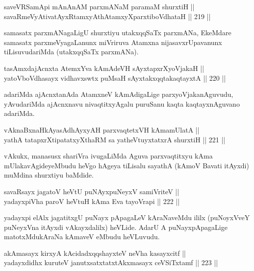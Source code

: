 \begin{shl}
saveVRSamApi mAnAnAM parxmANaM paramaM shurxtiH || \\
savaRmeVyAtivatAyxRtamxyAthAtamxyXparxtiboVdhataH \hfill || 219 ||  
\end{shl}

\begin{artha}
samasatx parxmANagaLigU shurxtiyu utakxqqSaTx parxmANa, EkeMdare
samasatx parxmeVyagaLanunx miVriruva Atamxna nijasavxrUpavanunx
tiLisuvudariMda (utakxqqSaTx parxmANa).
\end{artha}

\begin{shl}
tasAmxdajAcnxta AtemxYva kAmAdeVH sAyxtapxrXyoVjakaH || \\
yatoV\s boVdhasayx vidhavxswtx puMsaH sAyxtakxqqtakaqtayxtA \hfill || 220 ||  
\end{shl}

\begin{artha}
adariMda ajAcnxtanAda AtamxneV kAmAdigaLige parxyoVjakanAguvudu,
yAvudariMda ajAcnxnavu nivaqtitxyAgalu puruSanu kaqta kaqtayxnAguvano
adariMda.
\end{artha}


\begin{shl}
vAknaBxnaHkAyasAdhAyxyAH parxvaqtetxVH kAmamUlatA || \\
yathA tatapxrXtipatatxyXthaRM sa yatheVtuyxtatxrA shurxtiH \hfill || 221 ||  
\end{shl}

\begin{artha}
vAkukx, manasusx shariVra ivugaLiMda Aguva parxvaqtitxyu kAma
mUlakavAgideyeMbudu heVgo hAgeya tiLisalu sayathA (kAmoV Bavati
itAyxdi) muMdina shurxtiyu baMdide.
\end{artha}

\begin{shl}
savaRsayx jagatoV heVtU puNAyxpuNeyxV samiVriteV || \\
yadayxpiVha paroV heVtuH kAma Eva tayoVrapi \hfill || 222 ||  
\end{shl}

\begin{artha}
yadayxpi elAlx jagatitxgU puNayx pApagaLeV kAraNaveMdu ililx
(puNoyxVveY puNeyxVna itAyxdi vAkayxdalilx) heVLide. AdarU A
puNayxpApagaLige matotxMdukAraNa kAmaveV eMbudu heVLuvudu.
\end{artha}

\begin{shl}
akAmasayx kirxyA kAcidadxqqshayxteV neVha kasayxcitf || \\
yadayxdidhx kuruteV janutxsatxtatxtAkxmasayx ceVSiTxtamf \hfill || 223 ||  
\end{shl}


